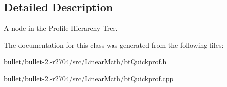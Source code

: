 \subsection{Detailed Description}
A node in the Profile Hierarchy Tree. 

The documentation for this class was generated from the following files\+:\begin{DoxyCompactItemize}
\item 
bullet/bullet-\/2.-\/r2704/src/\+Linear\+Math/bt\+Quickprof.\+h\item 
bullet/bullet-\/2.-\/r2704/src/\+Linear\+Math/bt\+Quickprof.\+cpp\end{DoxyCompactItemize}
